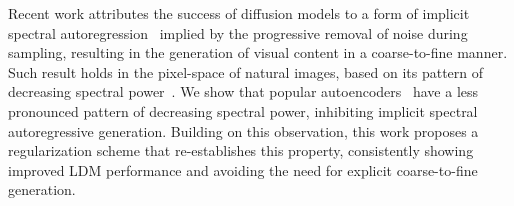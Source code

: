 Recent work attributes the success of diffusion models to a form of implicit spectral autoregression~\cite{InverseHeatDissipation,DCTdiff} implied by the progressive removal of noise during sampling, resulting in the generation of visual content in a coarse-to-fine manner.
Such result holds in the pixel-space of natural images, based on its pattern of decreasing spectral power~\cite{ruderman1977}.
We show that popular autoencoders~\cite{Flux,CosmosTokenizer,LTX-video,CogVideoX} have a less pronounced pattern of decreasing spectral power, inhibiting implicit spectral autoregressive generation.
Building on this observation, this work proposes a regularization scheme that re-establishes this property, consistently showing improved LDM performance and avoiding the need for explicit coarse-to-fine generation.







